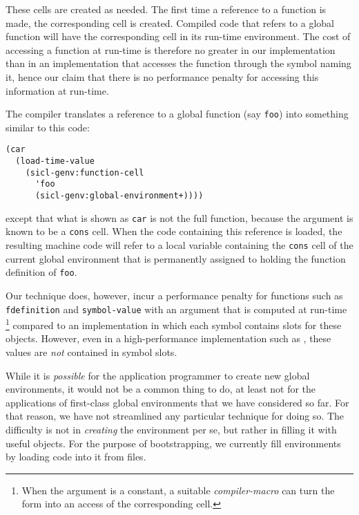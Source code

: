 These cells are created as needed.  The first time a reference to a
function is made, the corresponding cell is created.  Compiled code
that refers to a global function will have the corresponding cell in
its run-time environment.  The cost of accessing a function at
run-time is therefore no greater in our implementation than in an
implementation that accesses the function through the symbol naming
it, hence our claim that there is no performance penalty for accessing
this information at run-time.

The \sicl{} compiler translates a reference to a global function (say
\texttt{foo}) into something similar to this code:

{\small\begin{verbatim}
(car
  (load-time-value
    (sicl-genv:function-cell
      'foo
      (sicl-genv:global-environment+))))
\end{verbatim}}

except that what is shown as \texttt{car} is not the full
\commonlisp{} function, because the argument is known to be a
\texttt{cons} cell.  When the code containing this reference is
loaded, the resulting machine code will refer to a local variable
containing the \texttt{cons} cell of the current global environment
that is permanently assigned to holding the function definition of
\texttt{foo}.

Our technique does, however, incur a performance penalty for functions
such as \texttt{fdefinition} and \texttt{symbol-value} with an
argument that is computed at run-time%
\footnote{When the argument is a constant, a suitable
  \emph{compiler-macro} can turn the form into an access of the
  corresponding cell.}
compared to an implementation in which each symbol contains slots for
these objects.  However, even in a high-performance implementation such
as \sbcl{}, these values are \emph{not} contained in symbol slots.

While it is \emph{possible} for the application programmer to create
new global environments, it would not be a common thing to do, at
least not for the applications of first-class global environments that
we have considered so far.  For that reason, we have not streamlined
any particular technique for doing so.  The difficulty is not in
\emph{creating} the environment per se, but rather in filling it with
useful objects.  For the purpose of bootstrapping, we currently fill
environments by loading code into it from files.
